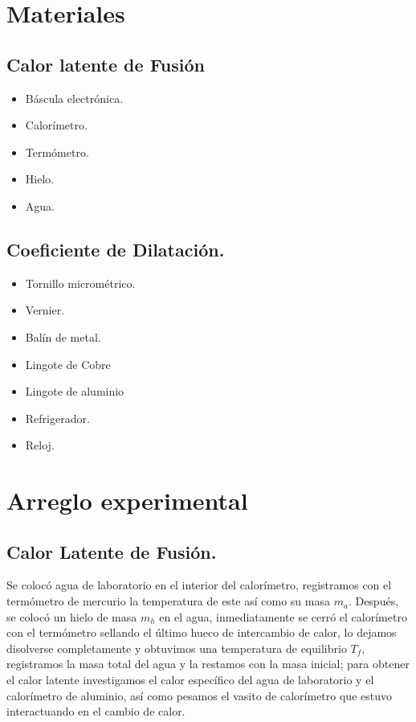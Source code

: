 \documentclass{article}
\begin{document}
\section{Materiales}
\subsection{Calor latente de Fusión}
            \begin{itemize}
                \item Báscula electrónica.
                \item Calorímetro.
                \item Termómetro.
                \item Hielo.
                \item Agua.
            \end{itemize}

\subsection{Coeficiente de Dilatación.}
            \begin{itemize}
                \item Tornillo micrométrico.
                \item Vernier.
                \item Balín de metal.
                \item Lingote de Cobre
                \item Lingote de aluminio
                \item Refrigerador.
                \item Reloj.
            \end{itemize}

\section{Arreglo experimental}
\subsection{Calor Latente de Fusión.}
        Se colocó agua de laboratorio en el interior del calorímetro, registramos con el termómetro de mercurio la temperatura de este así como su masa $m_a$. Después, se colocó un hielo de masa $m_h$ en el agua, inmediatamente se cerró el calorímetro con el termómetro sellando el último hueco de intercambio de calor, lo dejamos disolverse completamente y obtuvimos una temperatura de equilibrio $T_f$, registramos la masa total del agua y la restamos con la masa inicial; para obtener el calor latente investigamos el calor específico del agua de laboratorio y el calorímetro de aluminio, así como pesamos el vasito de calorímetro que estuvo interactuando en el cambio de calor.
    
\end{document}
